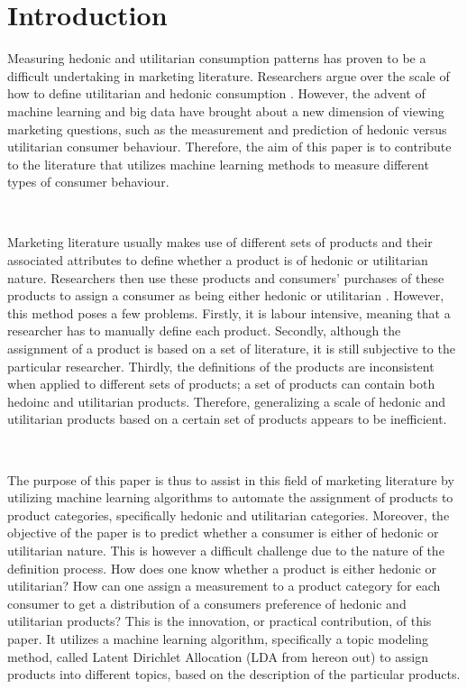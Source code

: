 \section{Introduction} %
\label{sec:introduction}
 
Measuring hedonic and utilitarian consumption patterns has proven to be a difficult undertaking in marketing literature. Researchers argue over the scale of how to define utilitarian and hedonic consumption \cite{batra1991measuring}. However, the advent of machine learning and big data have brought about a new dimension of viewing marketing questions, such as the measurement and prediction of hedonic versus utilitarian consumer behaviour. Therefore, the aim of this paper is to contribute to the literature that utilizes machine learning methods to measure different types of consumer behaviour. 

\

Marketing literature usually makes use of different sets of products and their associated attributes to define whether a product is of hedonic or utilitarian nature. Researchers then use these products and consumers' purchases of these products to assign a consumer as being either hedonic or utilitarian \citep{spangenberg1997measuring}. However, this method poses a few problems. Firstly, it is labour intensive, meaning that a researcher has to manually define each product. Secondly, although the assignment of a product is based on a set of literature, it is still subjective to the particular researcher. Thirdly, the definitions of the products are inconsistent when applied to different sets of products; a set of products can contain both hedoinc and utilitarian products. Therefore, generalizing a scale of hedonic and utilitarian products based on a certain set of products appears to be inefficient. 

\

The purpose of this paper is thus to assist in this field of marketing literature by utilizing machine learning algorithms to automate the assignment of products to product categories, specifically hedonic and utilitarian categories. Moreover, the objective of the paper is to predict whether a consumer is either of hedonic or utilitarian nature. This is however a difficult challenge due to the nature of the definition process. How does one know whether a product is either hedonic or utilitarian? How can one assign a measurement to a product category for each consumer to get a distribution of a consumers preference of hedonic and utilitarian products? This is the innovation, or practical contribution, of this paper. It utilizes a machine learning algorithm, specifically a topic modeling method, called Latent Dirichlet Allocation (LDA from hereon out) to assign products into different topics, based on the description of the particular products. 

